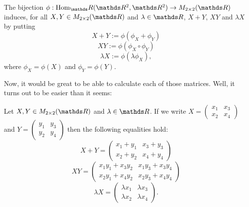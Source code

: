 \begin{df}
	The bijection $\phi:\hom_\R(\R^2,\R^2)\to M_{2\times 2}(\R)$ induces, for all $X,Y\in M_{2\times 2}(\R)$ and $\lambda\in \R$, $X+Y$, $XY$ and $\lambda X$ by putting $$X+Y:=\phi(\phi_X+\phi_Y)$$ $$XY:=\phi(\phi_X\circ \phi_Y)$$ $$\lambda X:=\phi(\lambda \phi_X),$$ where $\phi_X=\phi(X)$ and $\phi_Y=\phi(Y)$.
\end{df}

Now, it would be great to be able to calculate each of those matrices. Well, it turns out to be easier than it seems:

\begin{prop}
	Let $X,Y\in M_{2\times 2}(\R)$ and $\lambda\in \R$. If we write $X=\begin{pmatrix}
	x_1&x_3\\x_2&x_4
	\end{pmatrix}$ and $Y=\begin{pmatrix}
	y_1&y_3\\y_2&y_4
	\end{pmatrix}$ then the following equalities hold:
	\[X+Y=\begin{pmatrix}
	x_1+y_1&x_3+y_3\\
	x_2+y_2&x_4+y_4
	\end{pmatrix}\]\[XY=\begin{pmatrix}
	x_1y_1+x_3y_2&x_1y_3+x_3y_4\\
	x_2y_1+x_4y_2&x_2y_3+x_4y_4
	\end{pmatrix}\]\[\lambda X=\begin{pmatrix}
	\lambda x_1&\lambda x_3\\
	\lambda x_2&\lambda x_4
	\end{pmatrix}.\]
\end{prop}
